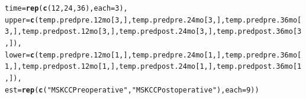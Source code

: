 \documentclass{article}\usepackage[]{graphicx}\usepackage[]{color}
\makeatletter
\newcommand{\hlnum}[1]{\textcolor[rgb]{0.686,0.059,0.569}{#1}}%
\newcommand{\hlstr}[1]{\textcolor[rgb]{0.192,0.494,0.8}{#1}}%
\newcommand{\hlstd}[1]{\textcolor[rgb]{0.345,0.345,0.345}{#1}}%
\newcommand{\hlkwc}[1]{\textcolor[rgb]{0.333,0.667,0.333}{#1}}%
\newcommand{\hlkwd}[1]{\textcolor[rgb]{0.737,0.353,0.396}{\textbf{#1}}}%
\newenvironment{kframe}{%
 \def\at@end@of@kframe{}%
 \ifinner\ifhmode%
  \def\at@end@of@kframe{\end{minipage}}%
  \begin{minipage}{\columnwidth}%
 \fi\fi%
 \def\FrameCommand##1{\hskip\@totalleftmargin \hskip-\fboxsep
 \colorbox{shadecolor}{##1}\hskip-\fboxsep
     \hskip-\linewidth \hskip-\@totalleftmargin \hskip\columnwidth}%
 \MakeFramed {\advance\hsize-\width
   \@totalleftmargin\z@ \linewidth\hsize
   \@setminipage}}%
 {\par\unskip\endMakeFramed%
 \at@end@of@kframe}
\newenvironment{knitrout}{}{} %
\makeatother
\begin{document}
\begin{knitrout}
\begin{kframe}
\begin{alltt}
        \hlkwc{time} \hlstd{=} \hlkwd{rep}\hlstd{(}\hlkwd{c}\hlstd{(}\hlnum{12}\hlstd{,} \hlnum{24}\hlstd{,} \hlnum{36}\hlstd{),} \hlkwc{each} \hlstd{=} \hlnum{3}\hlstd{),}
        \hlkwc{upper} \hlstd{=} \hlkwd{c}\hlstd{(temp.predpre.12mo[}\hlnum{3}\hlstd{,], temp.predpre.24mo[}\hlnum{3}\hlstd{,], temp.predpre.36mo[}\hlnum{3}\hlstd{,], temp.predpost.12mo[}\hlnum{3}\hlstd{,], temp.predpost.24mo[}\hlnum{3}\hlstd{,], temp.predpost.36mo[}\hlnum{3}\hlstd{,]),}
        \hlkwc{lower} \hlstd{=} \hlkwd{c}\hlstd{(temp.predpre.12mo[}\hlnum{1}\hlstd{,], temp.predpre.24mo[}\hlnum{1}\hlstd{,], temp.predpre.36mo[}\hlnum{1}\hlstd{,], temp.predpost.12mo[}\hlnum{1}\hlstd{,], temp.predpost.24mo[}\hlnum{1}\hlstd{,], temp.predpost.36mo[}\hlnum{1}\hlstd{,]),}
        \hlkwc{est} \hlstd{=} \hlkwd{rep}\hlstd{(}\hlkwd{c}\hlstd{(}\hlstr{"MSKCC Preoperative"}\hlstd{,} \hlstr{"MSKCC Postoperative"}\hlstd{),} \hlkwc{each} \hlstd{=} \hlnum{9}\hlstd{))}


\end{alltt}
\end{kframe}
\end{knitrout}
\end{document}
